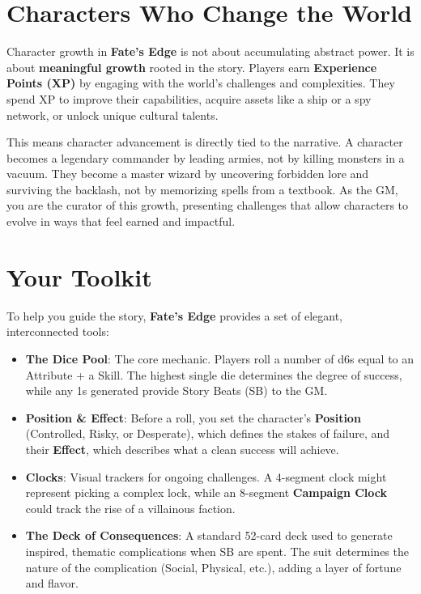 \section*{Characters Who Change the World}

Character growth in \textbf{Fate's Edge} is not about accumulating abstract power. It is about \textbf{meaningful growth} rooted in the story. Players earn \textbf{Experience Points (XP)} by engaging with the world's challenges and complexities. They spend XP to improve their capabilities, acquire assets like a ship or a spy network, or unlock unique cultural talents.

This means character advancement is directly tied to the narrative. A character becomes a legendary commander by leading armies, not by killing monsters in a vacuum. They become a master wizard by uncovering forbidden lore and surviving the backlash, not by memorizing spells from a textbook. As the GM, you are the curator of this growth, presenting challenges that allow characters to evolve in ways that feel earned and impactful.

\section*{Your Toolkit}

To help you guide the story, \textbf{Fate's Edge} provides a set of elegant, interconnected tools:

\begin{itemize}
    \item \textbf{The Dice Pool}: The core mechanic. Players roll a number of d6s equal to an Attribute + a Skill. The highest single die determines the degree of success, while any 1s generated provide Story Beats (SB) to the GM.
    \item \textbf{Position & Effect}: Before a roll, you set the character's \textbf{Position} (Controlled, Risky, or Desperate), which defines the stakes of failure, and their \textbf{Effect}, which describes what a clean success will achieve.
    \item \textbf{Clocks}: Visual trackers for ongoing challenges. A 4-segment clock might represent picking a complex lock, while an 8-segment \textbf{Campaign Clock} could track the rise of a villainous faction.
    \item \textbf{The Deck of Consequences}: A standard 52-card deck used to generate inspired, thematic complications when SB are spent. The suit determines the nature of the complication (Social, Physical, etc.), adding a layer of fortune and flavor.
\end{itemize}

